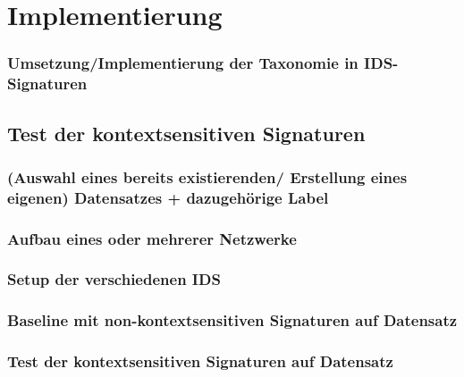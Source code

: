 \chapter{Implementierung}%
\label{cha:implementation}


		\subsection{ Umsetzung/Implementierung der Taxonomie in  IDS-Signaturen}
	\section{Test der kontextsensitiven Signaturen}
		\subsection{ (Auswahl eines bereits existierenden/ Erstellung eines eigenen) Datensatzes + dazugehörige Label }
		\subsection{ Aufbau eines oder mehrerer Netzwerke  } 
		\subsection{ Setup der verschiedenen IDS }
		\subsection{ Baseline mit non-kontextsensitiven Signaturen auf Datensatz }
		\subsection{ Test der kontextsensitiven Signaturen auf Datensatz} 
